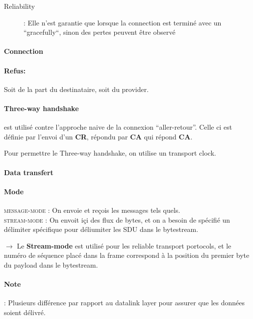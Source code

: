 \begin{description}
    \item[Reliability] : Elle n'est garantie que lorsque la connection est terminé avec un
        ``gracefully``, sinon des pertes peuvent être observé
\end{description}

\paragraph{Connection}

\paragraph{Refus:} Soit de la part du destinataire, soit du provider.

\paragraph{Three-way handshake} est utilisé contre l'approche naive de la connexion ``aller-retour''. Celle ci est définie par l'envoi d'un \textbf{CR}, répondu par \textbf{CA} qui répond \textbf{CA}.

Pour permettre le Three-way handshake, on utilise un transport clock.


\paragraph{Data transfert}

\paragraph{Mode}
\textsc{message-mode} : On envoie et reçois les messages tels quels.\\
\textsc{stream-mode} : On envoit içi des flux de bytes, et on a besoin de spécifié un délimiter
spécifique pour déliumiter les SDU dans le bytestream.

$\rightarrow$  Le \textbf{Stream-mode}  est utilisé  pour les  reliable
transport portocols,  et le  numéro de séquence  placé dans  la frame
correspond à la position du premier byte du payload dans le bytestream.

\paragraph{Note} : Plusieurs différence par rapport au datalink layer pour assurer que les
données soient délivré.

